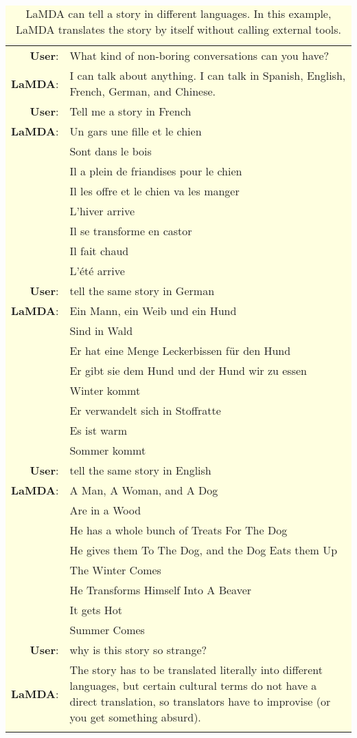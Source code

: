 \documentclass{article}
\begin{document}
\begin{table}[ht!]
\small
\centering
\colorbox{lightyellow}{

\begin{tabular}{rp{12cm}}
\textbf{User}: & What kind of non-boring conversations can you have?\\
\textbf{LaMDA}: & I can talk about anything. I can talk in Spanish, English, French, German, and Chinese.\\
\textbf{User}: & Tell me a story in French\\
\textbf{LaMDA}: & Un gars une fille et le chien\\
& Sont dans le bois\\
& Il a plein de friandises pour le chien\\
& Il les offre et le chien va les manger\\
& L'hiver arrive\\
& Il se transforme en castor\\
& Il fait chaud\\
& L'été arrive\\
\textbf{User}: & tell the same story in German\\
\textbf{LaMDA}: & Ein Mann, ein Weib und ein Hund\\
& Sind in Wald\\
& Er hat eine Menge Leckerbissen für den Hund\\
& Er gibt sie dem Hund und der Hund wir zu essen\\
& Winter kommt\\
& Er verwandelt sich in Stoffratte\\
& Es ist warm\\
& Sommer kommt\\
\textbf{User}: & tell the same story in English\\
\textbf{LaMDA}: & A Man, A Woman, and A Dog\\
& Are in a Wood\\
& He has a whole bunch of Treats For The Dog\\
& He gives them To The Dog, and the Dog Eats them Up\\
& The Winter Comes\\
& He Transforms Himself Into A Beaver\\
& It gets Hot\\
& Summer Comes\\
\textbf{User}: & why is this story so strange?\\
\textbf{LaMDA}: & The story has to be translated literally into different languages, but certain cultural terms do not have a direct translation, so translators have to improvise (or you get something absurd).\\
\\
\end{tabular}
}
\caption{LaMDA can tell a story in different languages. In this example, LaMDA translates the story by itself without calling external tools.}
\label{tab:example-conv20}
\end{table}
\end{document}
